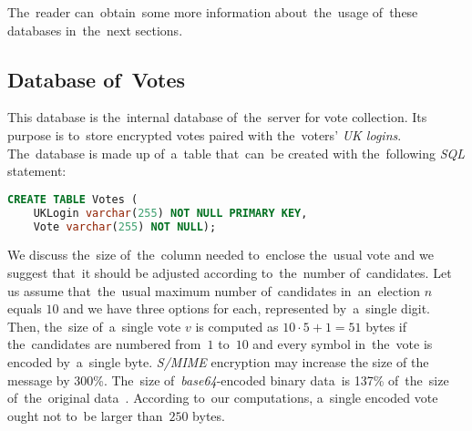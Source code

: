 The~reader can~obtain~some more information about~the~usage of~these databases in~the~next sections.

\subsection{Database of~Votes}
\label{sub:votes}
This database is the~internal database of~the~server for vote collection. Its purpose is to~store encrypted votes paired with the~voters' \emph{UK logins}. The~database is made up of~a~table that~can~be created with the~following \emph{SQL} statement: \break %

\begin{lstlisting}[language=SQL]
CREATE TABLE Votes (
	UKLogin varchar(255) NOT NULL PRIMARY KEY,
	Vote varchar(255) NOT NULL);
\end{lstlisting}
\bigbreak

We discuss the~size of~the~column needed to~enclose the~usual vote and we suggest that~it should be adjusted according to~the~number of~candidates. Let us assume that~the~usual maximum number of~candidates in~an~election $n$ equals $10$ and we have three options for each, represented by~a~single digit. Then, the~size of~a~single vote $v$ is computed as $10\cdot 5 + 1 = 51$ bytes if the~candidates are numbered from~$1$ to~$10$ and every symbol in~the~vote is encoded by~a~single byte. \emph{S/MIME} encryption may increase the size of the message by 300\%. The~size of~\emph{base64}-encoded binary data~is 137\% of~the~size of~the~original data~\cite{SMIME, CiscoSize}. According to~our computations, a~single encoded vote ought not to~be larger than~$250$ bytes. %
